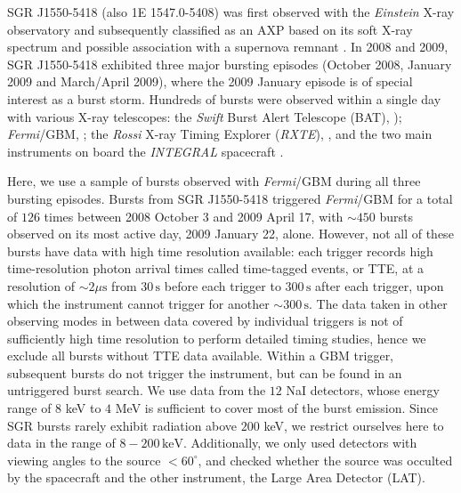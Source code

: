 \documentclass[12pt]{emulateapj}
\newcommand{\project}[1]{\textsl{#1}}
\newcommand{\fermi}{\project{Fermi}}
\newcommand{\rxte}{\project{RXTE}}
\begin{document}
SGR J1550-5418 (also 1E 1547.0-5408) was first observed with the {\it Einstein} X-ray observatory \citep{lamb1981}
and subsequently classified as an AXP based on its soft X-ray spectrum and possible association with a supernova remnant \citep{gelfand2007}.
In 2008 and 2009, SGR J1550-5418 exhibited three major bursting episodes (October 2008, January 2009 and March/April 2009), where the 2009 January episode is of special interest as a
burst storm. Hundreds of bursts were observed within a single day with various X-ray telescopes: the \project{Swift} Burst Alert Telescope (BAT), \citep{israel2010, scholz2011}); \fermi/GBM, \citep{kaneko2010,vonkienlin2012,vanderhorst2012}; the \project{Rossi} X-ray Timing Explorer (\rxte), \citep{dib2012}, and the two main instruments on board the \project{INTEGRAL} spacecraft \citep{mereghetti2009, savchenko2010}.
 
Here, we use a sample of bursts observed with \fermi/GBM \citep{meegan2009} during all three bursting episodes. Bursts from SGR J1550-5418 triggered \fermi/GBM for a total of $126$ 
times between 2008 October 3 and 2009 April 17, with $\sim\!\! 450$ bursts observed on its most active day, 2009 January 22, alone. However, not all of these bursts have data with high time resolution
available: each trigger records high time-resolution photon arrival times called time-tagged events, or TTE, at a resolution of $\sim\!\! 2\mu\mathrm{s}$ from $30\,\mathrm{s}$ 
before each trigger to $300\,\mathrm{s}$ after each trigger, upon which the instrument cannot trigger for another $\sim\!\! 300 \,\mathrm{s}$. The data taken in other observing modes in between data covered
by individual triggers is not of sufficiently high time resolution to perform detailed timing studies, hence we exclude all bursts without TTE data available.
Within a GBM trigger, subsequent bursts do not trigger the instrument, but can be found in an untriggered burst search.
We use data from the $12$ NaI detectors, whose energy range of $8$ keV to $4$ MeV is sufficient to cover most of the burst emission. Since SGR bursts rarely exhibit radiation above $200$ keV, we restrict ourselves 
here to data in the range of $8 - 200 \,\mathrm{keV}$. 
Additionally, we only used detectors with viewing angles to the source $< 60^{\circ}$, and checked whether the source was occulted by the spacecraft and the other instrument, the Large Area Detector (LAT). 
\end{document}
